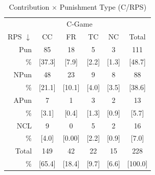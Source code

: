 \documentclass[11pt,a4paper]{article}
\newcommand{\mco}[2]{\multicolumn{#1}{c}{#2}}
\newcommand{\fns}{\footnotesize}
\begin{document}
\begin{refsection}
\begin{table}[htbp]
  \caption{Contribution $\times$ Punishment Type (C/RPS)}
  \centering
  \begin{tabular}{r|cccc|c}
  \mco{1}{}       & \mco{4}{C-Game} &                                                  \\ 
RPS  $\downarrow$ & CC              & FR         & TC        & NC        & Total       \\
\midrule
Pun               & 85              & 18         & 5         & 3         & 111         \\
\fns \%           & \fns[37.3]      & \fns[7.9]  & \fns[2.2] & \fns[1.3] & \fns[48.7]  \\
[.3em]          
  NPun            & 48              & 23         & 9         & 8         & 88          \\
\fns \%           & \fns[21.1]      & \fns[10.1] & \fns[4.0] & \fns[3.5] & \fns[38.6]  \\
[.3em]         
  APun            & 7               & 1          & 3         & 2         & 13          \\
\fns \%           & \fns[3.1]       & \fns[0.4]  & \fns[1.3] & \fns[0.9] & \fns[5.7]   \\
[.3em]        
NCL               & 9               & 0          & 5         & 2         & 16          \\
\fns \%           & \fns[4.0]       & \fns[0.00] & \fns[2.2] & \fns[0.9] & \fns[7.0]   \\
\midrule         
Total             & 149             & 42         & 22        & 15        & 228         \\
\fns \%           & \fns[65.4]      & \fns[18.4] & \fns[9.7] & \fns[6.6] & \fns[100.0] \\
\bottomrule
  \end{tabular}
  \label{tab:ccpunRPS}
\end{table}


\end{refsection}
\end{document}
